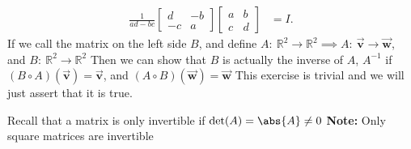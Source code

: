 \documentclass{report}
\begin{document}
\begin{itemize}
        \begin{align*}
            \frac{1}{ad-bc}\begin{bmatrix} d & -b \\ -c & a\end{bmatrix} \begin{bmatrix} a & b \\ c&d\end{bmatrix} &= I
        .\end{align*}
        \bigbreak \noindent 
        If we call the matrix on the left side $B$, and define $A:\ \mathbb{R}^{2} \to \mathbb{R}^{2} \implies A:\ \vec{\mathbf{v}} \to \vec{\mathbf{w}} $, and $B:\ \mathbb{R}^{2} \to \mathbb{R}^{2} $
        \bigbreak \noindent 
        Then we can show that $B$ is actually the inverse of $A$, $A^{-1}$ if $(B \circ A)(\vec{\mathbf{v}}) = \vec{\mathbf{v}}$, and $(A \circ B)(\vec{\mathbf{w}}) = \vec{\mathbf{w}} $
        \bigbreak \noindent 
        This exercise is trivial and we will just assert that it is true.

        \bigbreak \noindent 
        Recall that a matrix is only invertible if $\text{det}(A) = \abs{A} \ne 0$
        \bigbreak \noindent 
        \textbf{Note:} Only square matrices are invertible
        



\end{itemize}
\end{document}
